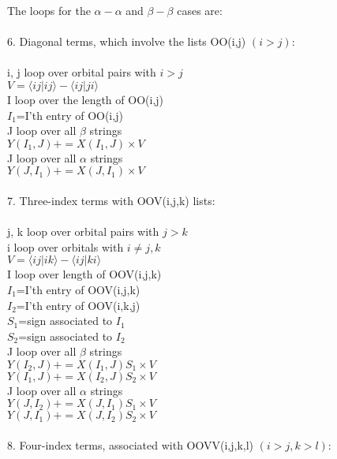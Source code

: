 \documentclass[twocolumn]{article}
\begin{document}
The loops for the $\alpha-\alpha$ and $\beta-\beta$ cases are:\\
\\
6. Diagonal terms, which involve the lists OO(i,j) $(i>j)$:\\
\\
i, j loop over orbital pairs with $i>j$\\
\indent $V=\langle ij|ij\rangle -\langle ij|ji\rangle$\\
\indent I loop over the length of OO(i,j)\\
\indent\indent $I_1$=I'th entry of OO(i,j)\\
\indent\indent J loop over all $\beta$ strings\\
\indent\indent\indent $Y(I_1,J)+=X(I_1,J)\times V$\\
\indent\indent J loop over all $\alpha$ strings\\
\indent\indent\indent $Y(J,I_1)+=X(J,I_1)\times V$\\
\\
7. Three-index terms with OOV(i,j,k) lists:\\
\\
j, k loop over orbital pairs with $j>k$\\
\indent i loop over orbitals with $i\neq j,k$\\
\indent\indent$V=\langle ij|ik\rangle -\langle ij|ki\rangle $\\
\indent\indent I loop over length of OOV(i,j,k)\\
\indent\indent\indent $I_1$=I'th entry of OOV(i,j,k)\\
\indent\indent\indent $I_2$=I'th entry of OOV(i,k,j)\\
\indent\indent\indent $S_1$=sign associated to $I_1$\\
\indent\indent\indent $S_2$=sign associated to $I_2$\\
\indent\indent\indent J loop over all $\beta$ strings\\
\indent\indent\indent\indent $Y(I_2,J)+=X(I_1,J)S_1\times V$\\
\indent\indent\indent\indent $Y(I_1,J)+=X(I_2,J)S_2\times V$\\
\indent\indent\indent J loop over all $\alpha$ strings\\
\indent\indent\indent\indent $Y(J,I_2)+=X(J,I_1)S_1\times V$\\
\indent\indent\indent\indent $Y(J,I_1)+=X(J,I_2)S_2\times V$\\
\\
8. Four-index terms, associated with OOVV(i,j,k,l) $(i>j,k>l)$:\\
\end{document}
